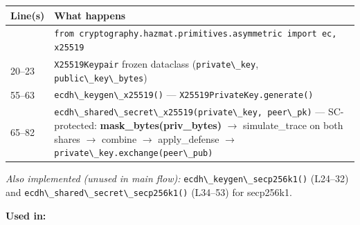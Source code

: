 \documentclass[11pt,a4paper]{article}
\newcommand{\code}[1]{\lstinline[basicstyle=\ttfamily\small]!#1!}
\begin{document}
\begin{longtable}{L{2.2cm} L{11.5cm}}
\toprule
\textbf{Line(s)} & \textbf{What happens} \\
\midrule
\endhead
\bottomrule
{}       & \code{from cryptography.hazmat.primitives.asymmetric import ec, x25519} \\
20--23  & \code{X25519Keypair} frozen dataclass (\code{private\_key}, \code{public\_key\_bytes}) \\
55--63  & \code{ecdh\_keygen\_x25519()} --- \code{X25519PrivateKey.generate()} \\
65--82  & \code{ecdh\_shared\_secret\_x25519(private\_key, peer\_pk)} --- SC-protected: \textbf{mask\_bytes(priv\_bytes)} $\to$ simulate\_trace on both shares $\to$ combine $\to$ apply\_defense $\to$ \code{private\_key.exchange(peer\_pub)} \\
\end{longtable}

\textit{Also implemented (unused in main flow):} \code{ecdh\_keygen\_secp256k1()} (L24--32) and \code{ecdh\_shared\_secret\_secp256k1()} (L34--53) for secp256k1.

\textbf{Used in:}
\end{document}
